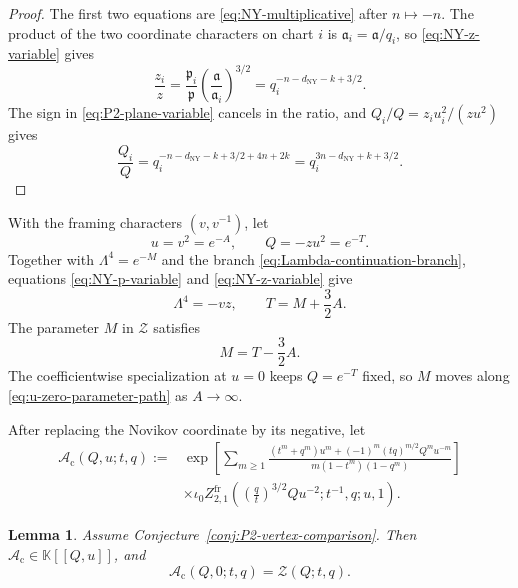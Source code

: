 \documentclass{amsart}
\newtheorem{lemma}{Lemma}
\theoremstyle{definition}
\numberwithin{equation}{section}
\newcommand{\K}{\mathbb K}
\begin{document}
\begin{proof}
The first two equations are \eqref{eq:NY-multiplicative} after \(n\mapsto-n\).  The product of the two coordinate characters on chart \(i\) is \(\mathfrak a_i=\mathfrak a/q_i\), so \eqref{eq:NY-z-variable} gives
\[
 \frac{z_i}{z}
 =\frac{\mathfrak p_i}{\mathfrak p}
  \left(\frac{\mathfrak a}{\mathfrak a_i}\right)^{3/2}
 =q_i^{-n-d_{\mathrm{NY}}-k+3/2}.
\]
The sign in \eqref{eq:P2-plane-variable} cancels in the ratio, and \(Q_i/Q=z_iu_i^2/(zu^2)\) gives
\[
 \frac{Q_i}{Q}
 =q_i^{-n-d_{\mathrm{NY}}-k+3/2+4n+2k}
 =q_i^{3n-d_{\mathrm{NY}}+k+3/2}.
\]
\end{proof}

With the framing characters \((v,v^{-1})\), let
\begin{equation}
 u=v^2=e^{-A},\qquad Q=-zu^2=e^{-T}.
\label{eq:centered-variables}
\end{equation}
Together with \(\Lambda^4=e^{-M}\) and the branch \eqref{eq:Lambda-continuation-branch}, equations \eqref{eq:NY-p-variable} and \eqref{eq:NY-z-variable} give
\begin{equation}
 \Lambda^4=-vz,\qquad T=M+\frac32A.
\label{eq:centered-parameter-equality}
\end{equation}
The parameter \(M\) in \(\mathscr Z\) satisfies
\begin{equation}
 M=T-\frac32A.
\label{eq:u-zero-parameter-path}
\end{equation}
The coefficientwise specialization at \(u=0\) keeps \(Q=e^{-T}\) fixed, so \(M\) moves along \eqref{eq:u-zero-parameter-path} as \(A\to\infty\).

After replacing the Novikov coordinate by its negative, let
\begin{equation}
\begin{aligned}
 \mathscr A_{\mathrm c}(Q,u;t,q):={}&
 \exp\left[
 \sum_{m\geq1}
 \frac{(t^m+q^m)u^m+(-1)^m(tq)^{m/2}Q^mu^{-m}}
 {m(1-t^m)(1-q^m)}\right]\\
 &\times\iota_0 Z_{2,1}^{\mathrm{fr}}
 \left(\left(\frac qt\right)^{3/2}Qu^{-2};
 t^{-1},q;u,1\right).
\end{aligned}
\label{eq:normalized-u-series}
\end{equation}
\begin{lemma}
\label{lem:u-zero-regularity}
Assume Conjecture~\ref{conj:P2-vertex-comparison}.  Then \(\mathscr A_{\mathrm c}\in\K[[Q,u]]\), and
\begin{equation}
 \mathscr A_{\mathrm c}(Q,0;t,q)=\mathcal Z(Q;t,q).
\label{eq:u-zero-constant-term}
\end{equation}
\end{lemma}
\end{document}
